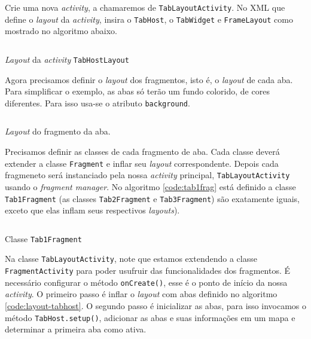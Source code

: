 \documentclass[a4paper,12pt,brazil]{book}
\begin{document}
\begin{singlespace}
	Crie uma nova \emph{activity}, a chamaremos de \texttt{TabLayoutActivity}. No XML que define o \emph{layout} da \emph{activity}, insira o \texttt{TabHost}, o \texttt{TabWidget} e \texttt{FrameLayout} como mostrado no algoritmo abaixo.
	
	\begin{listing}[H]
	\inputminted[linenos=true,fontsize=\small,frame=lines, framesep=2mm, tabsize=2,numbersep=5pt]{xml}{src/design/activity-tab-host.xml}
	\caption{\emph{Layout} da \emph{activity} \texttt{TabHostLayout}}
	\label{code:layout-tabhost}
	\end{listing}
	
	Agora precisamos definir o \emph{layout} dos fragmentos, isto é, o \emph{layout} de cada aba. Para simplificar o exemplo, as abas só terão um fundo colorido, de cores diferentes. Para isso usa-se o atributo \texttt{background}.
	
	\begin{listing}[H]
	\inputminted[linenos=true,fontsize=\small,frame=lines, framesep=2mm, tabsize=2,numbersep=5pt]{xml}{src/design/tab-fragment.xml}
	\caption{\emph{Layout} do fragmento da aba.}
	\end{listing}
	
	Precisamos definir as classes de cada fragmento de aba. Cada classe deverá extender a classe \texttt{Fragment} e inflar seu \emph{layout} correspondente. Depois cada fragmeneto será instanciado pela nossa \emph{activity} principal, \texttt{TabLayoutActivity} usando o \emph{fragment manager}. No algoritmo \ref{code:tab1frag} está definido a classe \texttt{Tab1Fragment} (as classes \texttt{Tab2Fragment} e \texttt{Tab3Fragment}) são exatamente iguais, exceto que elas inflam seus respectivos \emph{layouts}).
	
	
	\begin{listing}[H]
	\inputminted[linenos=true,fontsize=\small,frame=lines, framesep=2mm, tabsize=2,numbersep=5pt]{java}{src/design/tab1-frag.java}
	\caption{Classe \texttt{Tab1Fragment}}
	\label{code:tab1frag}
	\end{listing}
	
	Na classe \texttt{TabLayoutActivity}, note que estamos extendendo a classe \texttt{FragmentActivity} para poder usufruir das funcionalidades dos fragmentos. É necessário configurar o método \texttt{onCreate()}, esse é o ponto de início da nossa \emph{activity}. O primeiro passo é inflar o \emph{layout} com abas definido no algoritmo \ref{code:layout-tabhost}. O segundo passo é inicializar as abas, para isso invocamos o método \texttt{TabHost.setup()}, adicionar as abas e suas informações em um mapa e determinar a primeira aba como ativa.
	

\end{singlespace}
\end{document}

